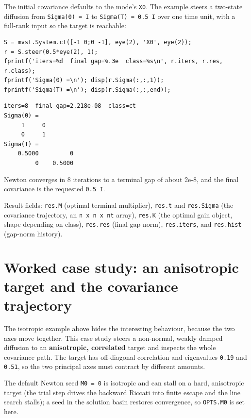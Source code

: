 \documentclass[11pt,oneside]{report}
\newcommand{\code}[1]{\texttt{#1}}
\begin{document}
The initial covariance defaults to the mode's \code{X0}. The example steers a
two-state diffusion from \code{Sigma(0) = I} to \code{Sigma(T) = 0.5 I} over one time
unit, with a full-rank input so the target is reachable:

\begin{lstlisting}[style=matlabstyle]
S = mvst.System.ct([-1 0;0 -1], eye(2), 'X0', eye(2));
r = S.steer(0.5*eye(2), 1);
fprintf('iters=%d  final gap=%.3e  class=%s\n', r.iters, r.res, r.class);
fprintf('Sigma(0) =\n'); disp(r.Sigma(:,:,1));
fprintf('Sigma(T) =\n'); disp(r.Sigma(:,:,end));
\end{lstlisting}

\begin{lstlisting}[style=outputstyle]
iters=8  final gap=2.218e-08  class=ct
Sigma(0) =
     1     0
     0     1
Sigma(T) =
    0.5000         0
         0    0.5000
\end{lstlisting}

Newton converges in 8 iterations to a terminal gap of about 2e-8, and the final
covariance is the requested \code{0.5 I}.

Result fields: \code{res.M} (optimal terminal multiplier), \code{res.t} and \code{res.Sigma}
(the covariance trajectory, an \code{n x n x nt} array), \code{res.K} (the optimal gain
object, shape depending on class), \code{res.res} (final gap norm), \code{res.iters}, and
\code{res.hist} (gap-norm history).

\hypertarget{worked-case-study-an-anisotropic-target-and-the-covariance-trajectory}{%
\section{Worked case study: an anisotropic target and the covariance trajectory}\label{worked-case-study-an-anisotropic-target-and-the-covariance-trajectory}}

The isotropic example above hides the interesting behaviour, because the two
axes move together. This case study steers a non-normal, weakly damped diffusion
to an \textbf{anisotropic, correlated} target and inspects the whole covariance path.
The target has off-diagonal correlation and eigenvalues \code{0.19} and \code{0.51}, so
the two principal axes must contract by different amounts.

The default Newton seed \code{M0 = 0} is isotropic and can stall on a hard,
anisotropic target (the trial step drives the backward Riccati into finite
escape and the line search stalls); a seed in the solution basin restores
convergence, so \code{OPTS.M0} is set here.
\end{document}
